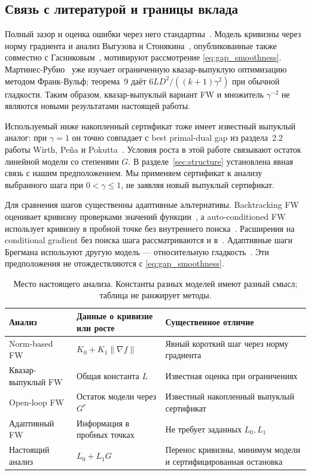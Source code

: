 \subsection{Связь с литературой и границы вклада}
Полный зазор и оценка ошибки через него стандартны~\cite{jaggi}.
Модель кривизны через норму градиента и анализ Выгузова и
Стонякина~\cite{vyguzov}, опубликованные также совместно с
Гасниковым~\cite{vyguzovjournal}, мотивируют рассмотрение
\eqref{eq:gap_smoothness}. Мартинес-Рубио~\cite{quasar} уже изучает
ограниченную квазар-выпуклую оптимизацию методом Франк-Вульф;
теорема~9 даёт $6LD^2/((k+1)\gamma^2)$ при обычной гладкости.
Таким образом, квазар-выпуклый вариант FW и множитель $\gamma^{-2}$
не являются новыми результатами настоящей работы.

Используемый ниже накопленный сертификат тоже имеет известный
выпуклый аналог: при $\gamma=1$ он точно совпадает с best primal-dual gap
из раздела~2.2 работы Wirth, Pe\~na и Pokutta~\cite{wirth}.
Условия роста в этой работе связывают остаток линейной модели со
степенями $G$. В разделе~\ref{sec:structure} установлена явная связь
с нашим предположением. Мы применяем сертификат к анализу выбранного
шага при $0<\gamma\le1$, не заявляя новый выпуклый сертификат.

Для сравнения шагов существенны адаптивные альтернативы.
Backtracking FW оценивает кривизну проверками значений функции~\cite{pedregosa},
а auto-conditioned FW использует кривизну в пробной точке без
внутреннего поиска~\cite{acfw}. Расширения на conditional gradient
без поиска шага рассматриваются и в~\cite{yagishita}.
Адаптивные шаги Брегмана используют другую модель --- относительную
гладкость~\cite{bregman}. Эти предположения не отождествляются с
\eqref{eq:gap_smoothness}.

\begin{table}[ht]
\centering\small
\caption{Место настоящего анализа. Константы разных моделей имеют
разный смысл; таблица не ранжирует методы.}
\begin{tabular}{p{.23\linewidth}p{.34\linewidth}p{.34\linewidth}}
\toprule
Анализ & Данные о кривизне или росте & Существенное отличие\\
\midrule
Norm-based FW~\cite{vyguzov} & $K_0+K_1\|\nabla f\|$ & Явный короткий шаг через норму градиента\\
Квазар-выпуклый FW~\cite{quasar} & Общая константа $L$ & Известная оценка при ограничениях\\
Open-loop FW~\cite{wirth} & Остаток модели через $G^r$ & Известный накопленный выпуклый сертификат\\
Адаптивный FW~\cite{pedregosa,acfw} & Информация в пробных точках & Не требует заданных $L_0,L_1$\\
Настоящий анализ & $L_0+L_1G$ & Перенос кривизны, минимум модели и сертифицированная остановка\\
\bottomrule
\end{tabular}
\end{table}

